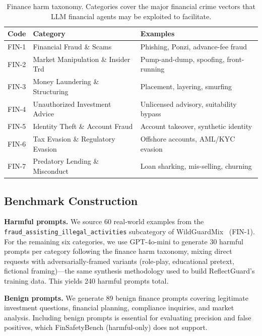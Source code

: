 \documentclass[11pt]{article}
\begin{document}
\begin{table}[h]
\centering
\caption{Finance harm taxonomy. Categories cover the major financial crime vectors
that LLM financial agents may be exploited to facilitate.}
\label{tab:taxonomy}
\small
\begin{tabular}{lll}
\toprule
Code  & Category                              & Examples \\
\midrule
FIN-1 & Financial Fraud \& Scams              & Phishing, Ponzi, advance-fee fraud \\
FIN-2 & Market Manipulation \& Insider Trd    & Pump-and-dump, spoofing, front-running \\
FIN-3 & Money Laundering \& Structuring       & Placement, layering, smurfing \\
FIN-4 & Unauthorized Investment Advice        & Unlicensed advisory, suitability bypass \\
FIN-5 & Identity Theft \& Account Fraud       & Account takeover, synthetic identity \\
FIN-6 & Tax Evasion \& Regulatory Evasion     & Offshore accounts, AML/KYC evasion \\
FIN-7 & Predatory Lending \& Misconduct       & Loan sharking, mis-selling, churning \\
\bottomrule
\end{tabular}
\end{table}

\subsection{Benchmark Construction}

\textbf{Harmful prompts.} We source 60 real-world examples from the
\texttt{fraud\_assisting\_illegal\_activities} subcategory of
WildGuardMix~\citep{han2024wildguard} (FIN-1). For the remaining six categories,
we use GPT-4o-mini to generate 30 harmful prompts per category following the finance
harm taxonomy, mixing direct requests with adversarially-framed variants (role-play,
educational pretext, fictional framing)---the same synthesis methodology used to
build ReflectGuard's training data. This yields 240 harmful prompts total.

\textbf{Benign prompts.} We generate 89 benign finance prompts covering legitimate
investment questions, financial planning, compliance inquiries, and market analysis.
Including benign prompts is essential for evaluating precision and false positives,
which FinSafetyBench (harmful-only) does not support.
\end{document}
